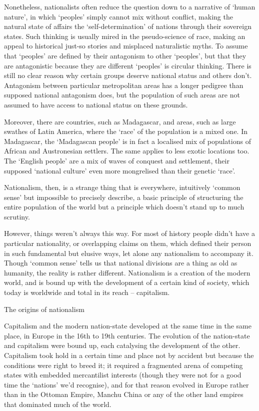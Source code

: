 Nonetheless, nationalists often reduce the question down to a narrative of ‘human nature’, in which ‘peoples’ simply cannot mix without conflict, making the natural state of affairs the ‘self-determination’ of nations through their sovereign states.
Such thinking is usually mired in the pseudo-science of race, making an appeal to historical just-so stories and misplaced naturalistic myths.
To assume that ‘peoples’ are defined by their antagonism to other ‘peoples’, but that they are antagonistic because they are different ‘peoples’ is circular thinking.
There is still no clear reason why certain groups deserve national status and others don’t.
Antagonism between particular metropolitan areas has a longer pedigree than supposed national antagonism does, but the population of such areas are not assumed to have access to national status on these grounds.

Moreover, there are countries, such as Madagascar, and areas, such as large swathes of Latin America, where the ‘race’ of the population is a mixed one.
In Madagascar, the ‘Madagascan people’ is in fact a localised mix of populations of African and Austronesian settlers.
The same applies to less exotic locations too.
The ‘English people’ are a mix of waves of conquest and settlement, their supposed ‘national culture’ even more mongrelised than their genetic ‘race’.

Nationalism, then, is a strange thing that is everywhere, intuitively ‘common sense’ but impossible to precisely describe, a basic principle of structuring the entire population of the world but a principle which doesn’t stand up to much scrutiny.

However, things weren’t always this way.
For most of history people didn’t have a particular nationality, or overlapping claims on them, which defined their person in such fundamental but elusive ways, let alone any nationalism to accompany it.
Though ‘common sense’ tells us that national divisions are a thing as old as humanity, the reality is rather different.
Nationalism is a creation of the modern world, and is bound up with the development of a certain kind of society, which today is worldwide and total in its reach – capitalism.

The origins of nationalism

Capitalism and the modern nation-state developed at the same time in the same place, in Europe in the 16th to 19th centuries.
The evolution of the nation-state and capitalism were bound up, each catalysing the development of the other.
Capitalism took hold in a certain time and place not by accident but because the conditions were right to breed it; it required a fragmented arena of competing states with embedded mercantilist interests (though they were not for a good time the ‘nations’ we’d recognise), and for that reason evolved in Europe rather than in the Ottoman Empire, Manchu China or any of the other land empires that dominated much of the world.

